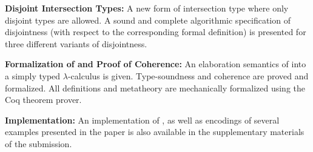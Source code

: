 \begin{itemize*}

\item \textbf{Disjoint Intersection Types:} A new form of intersection type
where only disjoint types are allowed. A sound and complete algorithmic
specification of disjointness (with respect to the corresponding formal
definition) is presented for three different variants of disjointness.


\item \textbf{Formalization of \name and Proof of Coherence:} An
   elaboration semantics of \name into a simply typed $\lambda$-calculus is
   given. Type-soundness and coherence are proved and formalized. All
   definitions and metatheory are mechanically formalized using the Coq theorem prover.

\item \textbf{Implementation:} An implementation of \name, as
well as encodings of several examples presented in the paper is also
available in the supplementary materials of the submission.

\end{itemize*}

